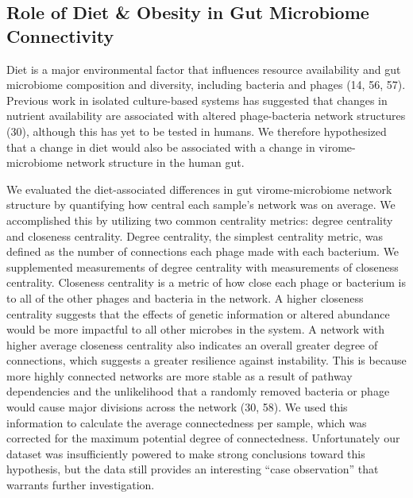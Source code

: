 \documentclass[12pt,]{article}
\begin{document}
\subsection{Role of Diet \& Obesity in Gut Microbiome
Connectivity}\label{role-of-diet-obesity-in-gut-microbiome-connectivity}

Diet is a major environmental factor that influences resource
availability and gut microbiome composition and diversity, including
bacteria and phages (14, 56, 57). Previous work in isolated
culture-based systems has suggested that changes in nutrient
availability are associated with altered phage-bacteria network
structures (30), although this has yet to be tested in humans. We
therefore hypothesized that a change in diet would also be associated
with a change in virome-microbiome network structure in the human gut.

We evaluated the diet-associated differences in gut virome-microbiome
network structure by quantifying how central each sample's network was
on average. We accomplished this by utilizing two common centrality
metrics: degree centrality and closeness centrality. Degree centrality,
the simplest centrality metric, was defined as the number of connections
each phage made with each bacterium. We supplemented measurements of
degree centrality with measurements of closeness centrality. Closeness
centrality is a metric of how close each phage or bacterium is to all of
the other phages and bacteria in the network. A higher closeness
centrality suggests that the effects of genetic information or altered
abundance would be more impactful to all other microbes in the system. A
network with higher average closeness centrality also indicates an
overall greater degree of connections, which suggests a greater
resilience against instability. This is because more highly connected
networks are more stable as a result of pathway dependencies and the
unlikelihood that a randomly removed bacteria or phage would cause major
divisions across the network (30, 58). We used this information to
calculate the average connectedness per sample, which was corrected for
the maximum potential degree of connectedness. Unfortunately our dataset
was insufficiently powered to make strong conclusions toward this
hypothesis, but the data still provides an interesting ``case
observation'' that warrants further investigation.
\end{document}
